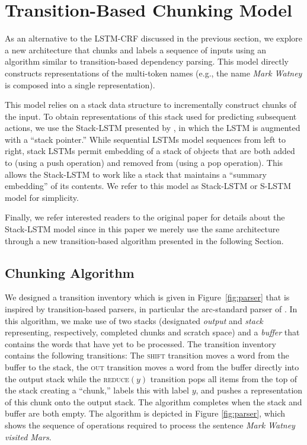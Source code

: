 \documentclass[11pt,letterpaper]{article}
\begin{document}
\section{Transition-Based Chunking Model}
\label{stacklstm}

As an alternative to the LSTM-CRF discussed in the previous section, we explore a new architecture that chunks and labels a sequence of inputs using an algorithm similar to transition-based dependency parsing. This model directly constructs representations of the multi-token names (e.g., the name \emph{Mark Watney} is composed into a single representation).

This model relies on a stack data structure to incrementally construct chunks of the input. To obtain representations of this stack used for predicting subsequent actions, we use the Stack-LSTM presented by , in which the LSTM is augmented with a ``stack pointer.'' While sequential LSTMs model sequences from left to right, stack LSTMs permit embedding of a stack of objects that are both added to (using a push operation) and removed from (using a pop operation). This allows the Stack-LSTM to work like a stack that maintains a ``summary embedding'' of its contents. We refer to this model as Stack-LSTM or S-LSTM model for simplicity. 

Finally, we refer interested readers to the original paper \cite{dyer:2015} for details about the Stack-LSTM model since in this paper we merely use the same architecture through a new transition-based algorithm presented in the following Section.

\subsection{Chunking Algorithm}

We designed a transition inventory which is given in Figure~\ref{fig:parser} that is inspired by transition-based parsers, in particular the arc-standard parser of . In this algorithm, we make use of two stacks (designated \emph{output} and \emph{stack} representing, respectively, completed chunks and scratch space) and a \emph{buffer} that contains the words that have yet to be processed. The transition inventory contains the following transitions: The \textsc{shift} transition moves a word from the buffer to the stack, the \textsc{out} transition moves a word from the buffer directly into the output stack while the \textsc{reduce}$(y)$ transition pops all items from the top of the stack creating a ``chunk,'' labels this with label $y$, and pushes a representation of this chunk onto the output stack. The algorithm completes when the stack and buffer are both empty. The algorithm is depicted in Figure \ref{fig:parser}, which shows the sequence of operations required to process the sentence \emph{Mark Watney visited Mars}.
\end{document}
